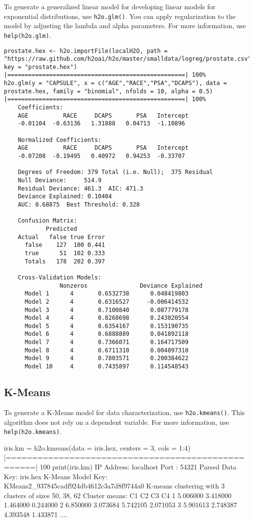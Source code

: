 To generate a generalized linear model for developing linear models for exponential distributions, use {\texttt{h2o.glm()}}. You can apply regularization to the model by adjusting the lambda and alpha parameters. 
For more information, use {\texttt{help(h2o.glm)}}.
\begin{lstlisting}[breaklines,basicstyle=\ttfamily]
prostate.hex <- h2o.importFile(localH2O, path = "https://raw.github.com/h2oai/h2o/master/smalldata/logreg/prostate.csv", key = "prostate.hex")
|===================================================| 100%
h2o.glm(y = "CAPSULE", x = c("AGE","RACE","PSA","DCAPS"), data = prostate.hex, family = "binomial", nfolds = 10, alpha = 0.5)
|===================================================| 100%
    Coefficients:
    AGE          RACE     DCAPS       PSA   Intercept
    -0.01104  -0.63136   1.31888   0.04713  -1.10896

    Normalized Coefficients:
    AGE          RACE     DCAPS       PSA   Intercept
    -0.07208  -0.19495   0.40972   0.94253  -0.33707

    Degrees of Freedom: 379 Total (i.e. Null);  375 Residual
    Null Deviance:     514.9
    Residual Deviance: 461.3  AIC: 471.3
    Deviance Explained: 0.10404
    AUC: 0.68875  Best Threshold: 0.328
    
    Confusion Matrix:
            Predicted
    Actual   false true Error
      false    127  100 0.441
      true      51  102 0.333
      Totals   178  202 0.397

    Cross-Validation Models:
                Nonzeros               Deviance Explained
      Model 1      4       0.6532738      0.048419803
      Model 2      4       0.6316527     -0.006414532
      Model 3      4       0.7100840      0.087779178
      Model 4      4       0.8268698      0.243020554
      Model 5      4       0.6354167      0.153190735
      Model 6      4       0.6888889      0.041892118
      Model 7      4       0.7366071      0.164717509
      Model 8      4       0.6711310      0.004897310
      Model 9      4       0.7803571      0.200384622
      Model 10     4       0.7435897      0.114548543
\end{lstlisting}

\subsection{K-Means}

To generate a K-Means model for data characterization, use {\texttt{h2o.kmeans()}}. This algorithm does not rely on a dependent variable. For more information, use {\texttt{help(h2o.kmeans)}}.
\begin{spverbatim}
iris.km = h2o.kmeans(data = iris.hex, centers = 3, cols = 1:4)
|===================================================| 100%
print(iris.km)
IP Address: localhost 
Port      : 54321 
Parsed Data Key: iris.hex 
K-Means Model Key: KMeans2_937845cadf924db4612c3a7d8f9744a0
K-means clustering with 3 clusters of sizes 50, 38, 62
Cluster means:
        C1       C2       C3       C4
1 5.006000 3.418000 1.464000 0.244000
2 6.850000 3.073684 5.742105 2.071053
3 5.901613 2.748387 4.393548 1.433871
  ....
\end{spverbatim}

